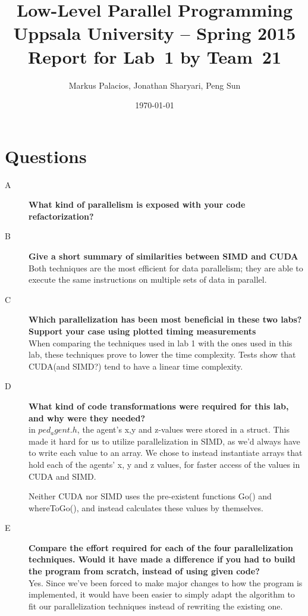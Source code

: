 \documentclass[a4paper,11pt]{article}
\title{\textbf{Low-Level Parallel Programming \\
    Uppsala University -- Spring 2015 \\
    Report for Lab~1
    by Team~21  %
  }
}
\author{Markus Palacios, Jonathan Sharyari, Peng Sun} %
\date{\today}
\begin{document}
\maketitle

\section{Questions}
\begin{description}
    \item[A] \textbf{What kind of parallelism is exposed with your code refactorization?}
 \hfill \\ 
 
    \item[B] \textbf{Give a short summary of similarities between SIMD and CUDA} \hfill \\Both techniques are the most efficient for data parallelism; they are able to execute the same instructions on multiple sets of data in parallel. 
    
    \item[C] \textbf{Which parallelization has been most beneficial in these two labs? Support your
case using plotted timing measurements} \hfill \\When comparing the techniques used in lab 1 with the ones used in this lab, these techniques prove to lower the time complexity. Tests show that CUDA(and SIMD?) tend to have a linear time complexity. 

    \item[D] \textbf{What kind of code transformations were required for this lab, and why were they
needed?} \hfill \\in $ped_agent.h$, the agent's x,y and z-values were stored in a struct. This made it hard for us to utilize parallelization in SIMD, as we'd always have to write each value to an array. We chose to instead instantiate arrays that hold each of the agents' x, y and z values, for faster access of the values in CUDA and SIMD. 

Neither CUDA nor SIMD uses the pre-existent functions Go() and whereToGo(), and instead calculates these values by themselves. 

    \item[E] \textbf{Compare the effort required for each of the four parallelization techniques. Would
it have made a difference if you had to build the program from scratch, instead
of using given code?} \hfill \\ Yes. Since we've been forced to make major changes to how the program is implemented, it would have been easier to simply adapt the algorithm to fit our parallelization techniques instead of rewriting the existing one. 
\end{description}
\end{document}
